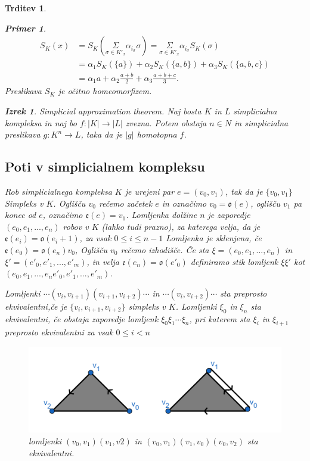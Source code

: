 \documentclass[a4paper,12pt]{article}
\theoremstyle{definition}
\theoremstyle{plain}
\newtheorem{izrek}{Izrek}
\theoremstyle{definition}
\newtheorem{primer}{Primer}
\theoremstyle{plain}
\newtheorem{trditev}{Trditev}
\theoremstyle{plain}
\theoremstyle{plain}
\theoremstyle{plain}
\begin{document}
\begin{trditev}
\begin{primer}
\begin{align*}
S_K(x)&=S_K(\underset{\sigma\in K'_x}{\Sigma} \alpha_{i_{\sigma}} 
 \sigma) =  \underset{\sigma\in K'_x}{\Sigma} \alpha_{i_{\sigma}} 
S_K(\sigma)\\
&=\alpha_1S_K(\{a\})+\alpha_2S_K(\{a,b\})+\alpha_3S_K(\{a,b,c\}) \\ 
&=\alpha_1a+\alpha_2\frac{a+b}{2}+\alpha_3\frac{a+b+c}{3}.
\end{align*}
Preslikava $S_K$ je očitno homeomorfizem.



\end{primer}
\begin{izrek}
    \textit{Simplicial approximation theorem}. Naj bosta $K$ in $L$ simplicialna kompleksa in naj bo $f:|K| \rightarrow |L|$ zvezna. Potem obstaja $n\in N$ in simplicialna preslikava
    $g:K^n\rightarrow L$, taka da je $|g|$ homotopna $f$.
\end{izrek}


\subsection{Poti v simplicialnem kompleksu}

\textit{Rob} simplicialnega kompleksa $K$ je urejeni par $e=(v_0,v_1)$, tak da je $\{v_0,v_1\}$ Simpleks v $K$. Oglišču $v_0$ rečemo \textit{začetek} $e$ in označimo 
$v_0=\mathfrak{o}(e)$, oglišču $v_1$ pa \textit{konec} od $e$, 
označimo $\mathfrak{e}(e)=v_1$. \textit{Lomljenka} dolžine $n$ je zaporedje
$(e_0,e_1,...,e_{n})$ robov v $K$ (lahko tudi prazno), za katerega velja, da je $\mathfrak{e}(e_i)=\mathfrak{o}(e_i+1)$, za vsak $0\leq i \leq n-1$
Lomljenka je sklenjena, če $\mathfrak{e}(e_0)=\mathfrak{o}(e_n)v_0$, Oglišču $v_0$ rečemo izhodišče. Če sta $\xi =(e_0,e_1,...,e_n)$ in $\xi'=(e'_0,e'_1,...,e'_{m})$, in velja $\mathfrak{e}(e_n)=\mathfrak{o}(e'_0)$ definiramo stik lomljenk $\xi\xi'$ kot $(e_0,e_1,...,e_{n}e'_0,e'_1,...,e'_{m})$.

Lomljenki $\cdots(v_i,v_{i+1})(v_{i+1},v_{i+2})\cdots$ in $\cdots(v_i,v_{i+2})\cdots$ sta preprosto ekvivalentni,če je $\{v_i,v_{i+1},v_{i+2}\}$ simpleks v $K$. Lomljenki $\xi_0$ in $\xi_n$ sta ekvivalentni, če obstaja zaporedje lomljenk $\xi_0\xi_1\cdots\xi_n$, pri katerem sta $\xi_i$ in $\xi_{i+1}$ preprosto ekvivalentni za vsak $0\leq i < n$


\begin{figure}
    \includegraphics[width=0.9\linewidth]{lomljenki2.png}
    \caption{lomljenki $(v_0,v_1)(v_1,v2)$ in $(v_0,v_1)(v_1,v_0)(v_0,v_2)$ sta ekvivalentni.}
\end{figure}


\end{trditev}
\end{document}
